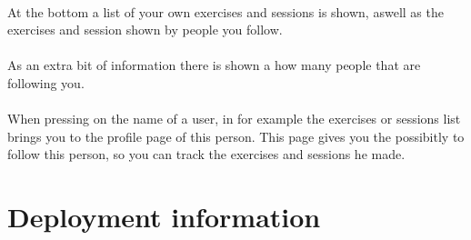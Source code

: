 \documentclass[11pt,a4paper]{scrartcl}
\begin{document}
\paragraph{}At the bottom a list of your own exercises and sessions is shown, aswell as the exercises and session shown by people you follow.
\paragraph{}As an extra bit of information there is shown a how many people that are following you.
\paragraph{}When pressing on the name of a user, in for example the exercises or sessions list brings you to the profile page of this person. This page gives you the possibitly to follow this person, so you can track the exercises and sessions he made.
\section{Deployment information}


\newpage        %

\newpage
\printindex                             %
\end{document}
